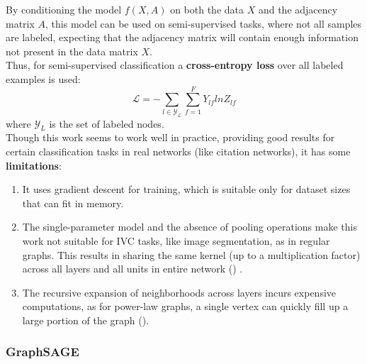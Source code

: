 By conditioning the model $f(X,A)$ on both the data $X$ and the adjacency
matrix $A$, this model can be used on semi-supervised tasks, where not all
samples are labeled, expecting that the adjacency matrix will contain enough
information not present in the data matrix $X$.\\
Thus, for semi-supervised classification a \textbf{cross-entropy loss} over all labeled
examples is used:
\begin{equation}
\mathcal{L} = - \sum_{l\in \mathcal{Y_L}} \sum_{f=1}^{F} Y_{lf}lnZ_{lf}
\end{equation}
where $\mathcal{Y}_L$ is the set of labeled nodes.\\
Though this work seems to work well in practice, providing good results for
certain classification tasks in real networks (like citation networks), it has
some \textbf{limitations}:
\begin{enumerate}
\item It uses gradient descent for training, which is suitable only for dataset sizes that can fit in memory.
\item The single-parameter model and the absence of pooling operations make this work not suitable for IVC
tasks, like image segmentation, as in regular graphs. This results in sharing
the same kernel (up to a multiplication factor) across all layers and all units
in entire network (\cite{blogpost}) .
\item The recursive expansion of neighborhoods across layers incurs expensive computations, as for power-law graphs, a single
vertex can quickly fill up a large portion of the graph (\cite{fastgcn}).
\end{enumerate}

\subsubsection*{GraphSAGE}
